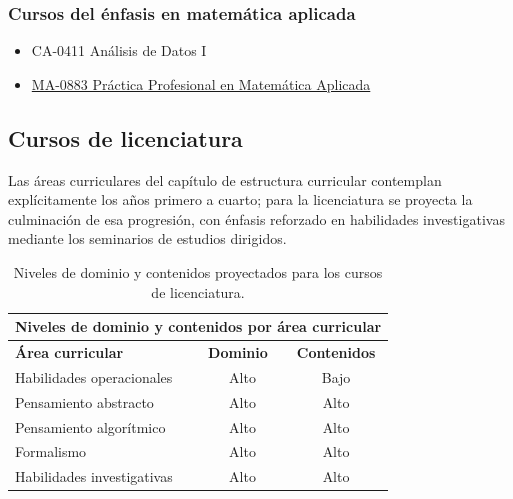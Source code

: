 \subsubsection*{Cursos del énfasis en matemática aplicada}
\begin{itemize}
    \item {CA-0411 Análisis de Datos I}
    \item \hyperlink{MA0883}{MA-0883 Práctica Profesional en Matemática Aplicada}
\end{itemize}

\subsection{Cursos de licenciatura}

Las áreas curriculares del capítulo de estructura curricular contemplan explícitamente los años primero a cuarto; para la licenciatura se proyecta la culminación de esa progresión, con énfasis reforzado en habilidades investigativas mediante los seminarios de estudios dirigidos.

\begin{table}[H]
\begin{center}
\begin{tabular}{|ccc|}
\hline
\multicolumn{3}{|c|}{\cellcolor[HTML]{00C0F3} \textbf{Niveles de dominio y contenidos por área curricular}} \\ \hline
\multicolumn{1}{|l|}{\cellcolor[HTML]{8ED8F8}\textbf{Área curricular}} & \multicolumn{1}{l|}{\cellcolor[HTML]{8ED8F8}\textbf{Dominio}} & \cellcolor[HTML]{8ED8F8}\textbf{Contenidos} \\ \hline
\multicolumn{1}{|l|}{Habilidades operacionales} & \multicolumn{1}{c|}{Alto} & Bajo \\ \hline
\multicolumn{1}{|l|}{Pensamiento abstracto} & \multicolumn{1}{c|}{Alto} & Alto \\ \hline
\multicolumn{1}{|l|}{Pensamiento algorítmico} & \multicolumn{1}{c|}{Alto} & Alto \\ \hline
\multicolumn{1}{|l|}{Formalismo} & \multicolumn{1}{c|}{Alto} & Alto \\ \hline
\multicolumn{1}{|l|}{Habilidades investigativas} & \multicolumn{1}{c|}{Alto} & Alto \\ \hline
\end{tabular}
\end{center}
\caption{Niveles de dominio y contenidos proyectados para los cursos de licenciatura.}
\end{table}

